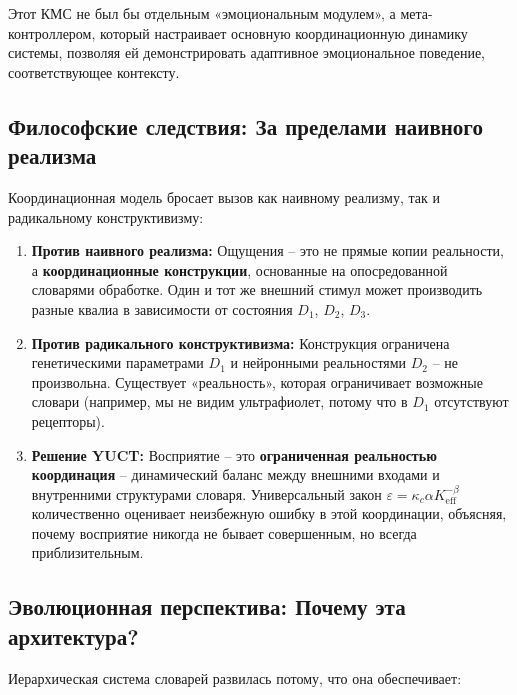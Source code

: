 \documentclass[12pt,a4paper]{article}
\newcommand{\eff}{\mathrm{eff}}
\newcommand{\Ke}{K_{\eff}}
\begin{document}
	Этот КМС не был бы отдельным «эмоциональным модулем», а мета-контроллером, который настраивает основную координационную динамику системы, позволяя ей демонстрировать адаптивное эмоциональное поведение, соответствующее контексту.
	
	\subsection{Философские следствия: За пределами наивного реализма}
	
	Координационная модель бросает вызов как наивному реализму, так и радикальному конструктивизму:
	
	\begin{enumerate}
		\item \textbf{Против наивного реализма:} Ощущения – это не прямые копии реальности, а \textbf{координационные конструкции}, основанные на опосредованной словарями обработке. Один и тот же внешний стимул может производить разные квалиа в зависимости от состояния $D_1$, $D_2$, $D_3$.
		
		\item \textbf{Против радикального конструктивизма:} Конструкция ограничена генетическими параметрами $D_1$ и нейронными реальностями $D_2$ – не произвольна. Существует «реальность», которая ограничивает возможные словари (например, мы не видим ультрафиолет, потому что в $D_1$ отсутствуют рецепторы).
		
		\item \textbf{Решение YUCT:} Восприятие – это \textbf{ограниченная реальностью координация} – динамический баланс между внешними входами и внутренними структурами словаря. Универсальный закон \(\varepsilon = \kappa_c \alpha \Ke^{-\beta}\) количественно оценивает неизбежную ошибку в этой координации, объясняя, почему восприятие никогда не бывает совершенным, но всегда приблизительным.
	\end{enumerate}
	
	\subsection{Эволюционная перспектива: Почему эта архитектура?}
	
	Иерархическая система словарей развилась потому, что она обеспечивает:
	
\end{document}
